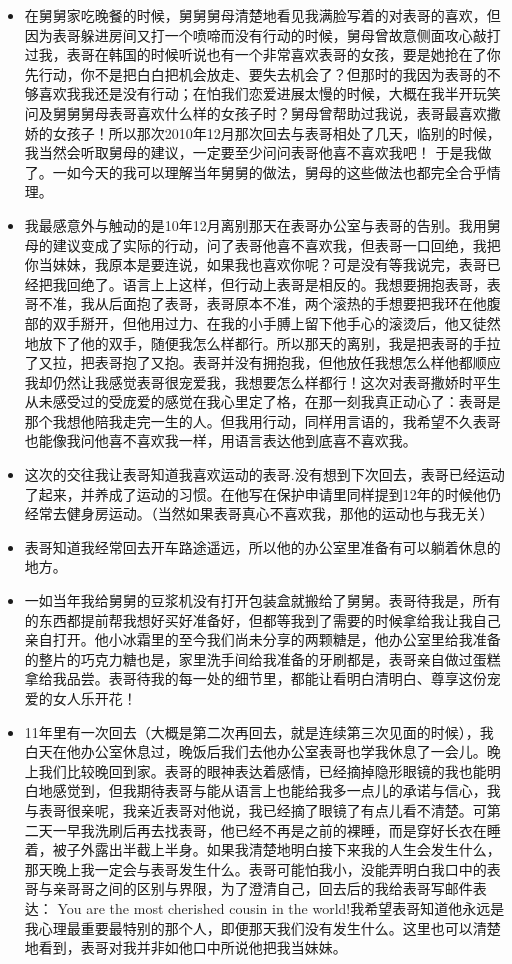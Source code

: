 \documentclass[9pt, b5paper]{article}
\begin{document}
\begin{itemize}
\begin{itemize}
\item 在舅舅家吃晚餐的时候，舅舅舅母清楚地看见我满脸写着的对表哥的喜欢，但因为表哥躲进房间又打一个喷啼而没有行动的时候，舅母曾故意侧面攻心敲打过我，表哥在韩国的时候听说也有一个非常喜欢表哥的女孩，要是她抢在了你先行动，你不是把白白把机会放走、要失去机会了？但那时的我因为表哥的不够喜欢我我还是没有行动；在怕我们恋爱进展太慢的时候，大概在我半开玩笑问及舅舅舅母表哥喜欢什么样的女孩子时？舅母曾帮助过我说，表哥最喜欢撒娇的女孩子！所以那次2010年12月那次回去与表哥相处了几天，临别的时候，我当然会听取舅母的建议，一定要至少问问表哥他喜不喜欢我吧！ 于是我做了。一如今天的我可以理解当年舅舅的做法，舅母的这些做法也都完全合乎情理。
\item 我最感意外与触动的是10年12月离别那天在表哥办公室与表哥的告别。我用舅母的建议变成了实际的行动，问了表哥他喜不喜欢我，但表哥一口回绝，我把你当妹妹，我原本是要连说，如果我也喜欢你呢？可是没有等我说完，表哥已经把我回绝了。语言上上这样，但行动上表哥是相反的。我想要拥抱表哥，表哥不准，我从后面抱了表哥，表哥原本不准，两个滚热的手想要把我环在他腹部的双手掰开，但他用过力、在我的小手膊上留下他手心的滚烫后，他又徒然地放下了他的双手，随便我怎么样都行。所以那天的离别，我是把表哥的手拉了又拉，把表哥抱了又抱。表哥并没有拥抱我，但他放任我想怎么样他都顺应我却仍然让我感觉表哥很宠爱我，我想要怎么样都行！这次对表哥撒娇时平生从未感受过的受庞爱的感觉在我心里定了格，在那一刻我真正动心了：表哥是那个我想他陪我走完一生的人。但我用行动，同样用言语的，我希望不久表哥也能像我问他喜不喜欢我一样，用语言表达他到底喜不喜欢我。
\item 这次的交往我让表哥知道我喜欢运动的表哥.没有想到下次回去，表哥已经运动了起来，并养成了运动的习惯。在他写在保护申请里同样提到12年的时候他仍经常去健身房运动。（当然如果表哥真心不喜欢我，那他的运动也与我无关）
\item 表哥知道我经常回去开车路途遥远，所以他的办公室里准备有可以躺着休息的地方。
\item 一如当年我给舅舅的豆浆机没有打开包装盒就搬给了舅舅。表哥待我是，所有的东西都提前帮我想好买好准备好，但都等我到了需要的时候拿给我让我自己亲自打开。他小冰霜里的至今我们尚未分享的两颗糖是，他办公室里给我准备的整片的巧克力糖也是，家里洗手间给我准备的牙刷都是，表哥亲自做过蛋糕拿给我品尝。表哥待我的每一处的细节里，都能让看明白清明白、尊享这份宠爱的女人乐开花！
\item 11年里有一次回去（大概是第二次再回去，就是连续第三次见面的时候），我白天在他办公室休息过，晚饭后我们去他办公室表哥也学我休息了一会儿。晚上我们比较晚回到家。表哥的眼神表达着感情，已经摘掉隐形眼镜的我也能明白地感觉到，但我期待表哥与能从语言上也能给我多一点儿的承诺与信心，我与表哥很亲呢，我亲近表哥对他说，我已经摘了眼镜了有点儿看不清楚。可第二天一早我洗刷后再去找表哥，他已经不再是之前的裸睡，而是穿好长衣在睡着，被子外露出半截上半身。如果我清楚地明白接下来我的人生会发生什么，那天晚上我一定会与表哥发生什么。表哥可能怕我小，没能弄明白我口中的表哥与亲哥哥之间的区别与界限，为了澄清自己，回去后的我给表哥写邮件表达： You are the most cherished cousin in the world!我希望表哥知道他永远是我心理最重要最特别的那个人，即便那天我们没有发生什么。这里也可以清楚地看到，表哥对我并非如他口中所说他把我当妹妹。

\end{itemize}
\end{itemize}
\end{document}
